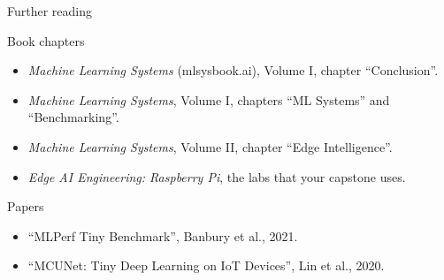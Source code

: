 \begin{frame}{Further reading}
  \footnotesize
  \begin{block}{Book chapters}
    \begin{itemize}
      \item \emph{Machine Learning Systems} (mlsysbook.ai), Volume I, chapter
            ``Conclusion''.
      \item \emph{Machine Learning Systems}, Volume I, chapters ``ML Systems''
            and ``Benchmarking''.
      \item \emph{Machine Learning Systems}, Volume II, chapter ``Edge
            Intelligence''.
      \item \emph{Edge AI Engineering: Raspberry Pi}, the labs that your
            capstone uses.
    \end{itemize}
  \end{block}
  \begin{block}{Papers}
    \begin{itemize}
      \item ``MLPerf Tiny Benchmark'', Banbury et al., 2021.
      \item ``MCUNet: Tiny Deep Learning on IoT Devices'', Lin et al., 2020.
    \end{itemize}
  \end{block}
\end{frame}
